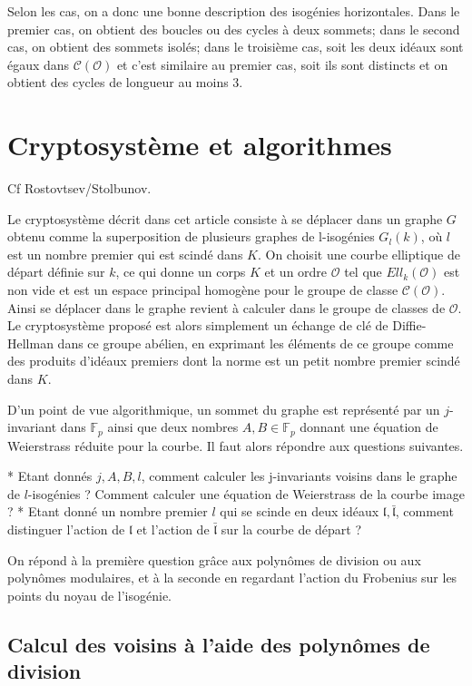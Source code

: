 \documentclass[11pt,a4paper]{article}
\newcommand{\F}{\mathbb{F}}
\renewcommand{\O}{\mathcal{O}}
\newcommand{\Cl}{\mathcal{C}}
\renewcommand{\frak}{\mathfrak}
\theoremstyle{definition}
\begin{document}
Selon les cas, on a donc une bonne description des isogénies horizontales. Dans le premier cas, on obtient des boucles ou des cycles à deux sommets; dans le second cas, on obtient des sommets isolés; dans le troisième cas, soit les deux idéaux sont égaux dans $\Cl(\O)$ et c'est similaire au premier cas, soit ils sont distincts et on obtient des cycles de longueur au moins 3.




\section{Cryptosystème et algorithmes}

Cf Rostovtsev/Stolbunov.

Le cryptosystème décrit dans cet article consiste à se déplacer dans un graphe $G$ obtenu comme la superposition de plusieurs graphes de l-isogénies $G_l(k)$, où $l$ est un nombre premier qui est scindé dans $K$. On choisit une courbe elliptique de départ définie sur $k$, ce qui donne un corps $K$ et un ordre $\O$ tel que $Ell_k(\O)$ est non vide et est un espace principal homogène pour le groupe de classe $\Cl(\O)$. Ainsi se déplacer dans le graphe revient à calculer dans le groupe de classes de $\O$. Le cryptosystème proposé est alors simplement un échange de clé de Diffie-Hellman dans ce groupe abélien, en exprimant les éléments de ce groupe comme des produits d'idéaux premiers dont la norme est un petit nombre premier scindé dans $K$.

D'un point de vue algorithmique, un sommet du graphe est représenté par un $j$-invariant dans $\F_p$ ainsi que deux nombres $A,B\in\F_p$ donnant une équation de Weierstrass réduite pour la courbe. Il faut alors répondre aux questions suivantes.

* Etant donnés $j,A,B,l$, comment calculer les j-invariants voisins dans le graphe de $l$-isogénies ? Comment calculer une équation de Weierstrass de la courbe image ?
* Etant donné un nombre premier $l$ qui se scinde en deux idéaux $\frak l,\bar{\frak l}$, comment distinguer l'action de $\frak l$ et l'action de $\bar{\frak l}$ sur la courbe de départ ?

On répond à la première question grâce aux polynômes de division ou aux polynômes modulaires, et à la seconde en regardant l'action du Frobenius sur les points du noyau de l'isogénie.

\subsection{Calcul des voisins à l'aide des polynômes de division}
\end{document}
